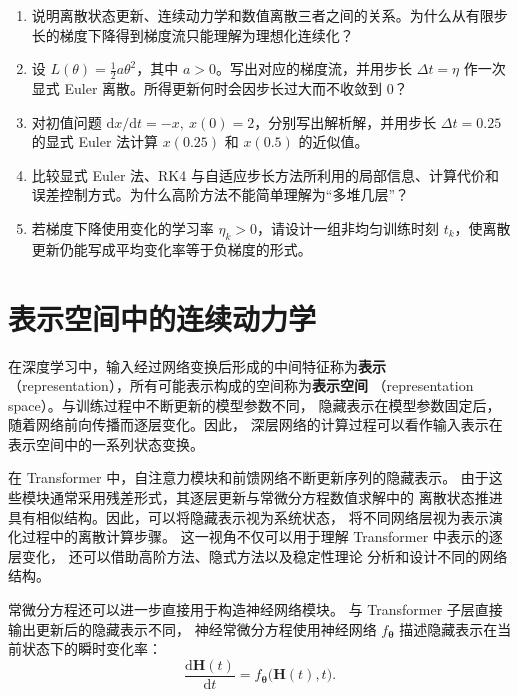 \documentclass[UTF8,a4paper,zihao=-4,oneside,openany]{ctexbook}
\begin{document}
\begin{exercisebox}
  \begin{enumerate}
    \item 说明离散状态更新、连续动力学和数值离散三者之间的关系。为什么从有限步长的梯度下降得到梯度流只能理解为理想化连续化？
    \item 设 \(L(\theta)=\tfrac12 a\theta^2\)，其中 \(a>0\)。写出对应的梯度流，并用步长 \(\Delta t=\eta\) 作一次显式 Euler 离散。所得更新何时会因步长过大而不收敛到 \(0\)？
    \item 对初值问题 \(\mathrm dx/\mathrm dt=-x,\ x(0)=2\)，分别写出解析解，并用步长 \(\Delta t=0.25\) 的显式 Euler 法计算 \(x(0.25)\) 和 \(x(0.5)\) 的近似值。
    \item 比较显式 Euler 法、RK4 与自适应步长方法所利用的局部信息、计算代价和误差控制方式。为什么高阶方法不能简单理解为“多堆几层”？
    \item 若梯度下降使用变化的学习率 \(\eta_k>0\)，请设计一组非均匀训练时刻 \(t_k\)，使离散更新仍能写成平均变化率等于负梯度的形式。
  \end{enumerate}
\end{exercisebox}



\section{表示空间中的连续动力学}
\label{sec:representation-dynamics}

在深度学习中，输入经过网络变换后形成的中间特征称为\textbf{表示}
（representation），所有可能表示构成的空间称为\textbf{表示空间}
（representation space）。与训练过程中不断更新的模型参数不同，
隐藏表示在模型参数固定后，随着网络前向传播而逐层变化。因此，
深层网络的计算过程可以看作输入表示在表示空间中的一系列状态变换。

在 Transformer 中，自注意力模块和前馈网络不断更新序列的隐藏表示。
由于这些模块通常采用残差形式，其逐层更新与常微分方程数值求解中的
离散状态推进具有相似结构。因此，可以将隐藏表示视为系统状态，
将不同网络层视为表示演化过程中的离散计算步骤。
这一视角不仅可以用于理解 Transformer 中表示的逐层变化，
还可以借助高阶方法、隐式方法以及稳定性理论
分析和设计不同的网络结构。

常微分方程还可以进一步直接用于构造神经网络模块。
与 Transformer 子层直接输出更新后的隐藏表示不同，
神经常微分方程使用神经网络
\(f_{\boldsymbol{\theta}}\)
描述隐藏表示在当前状态下的瞬时变化率：
\begin{equation}
    \frac{\mathrm{d}\boldsymbol{H}(t)}
    {\mathrm{d}t}
    =
    f_{\boldsymbol{\theta}}
    \bigl(
        \boldsymbol{H}(t),t
    \bigr).
    \label{eq:continuous-representation-dynamics}
\end{equation}
\end{document}
